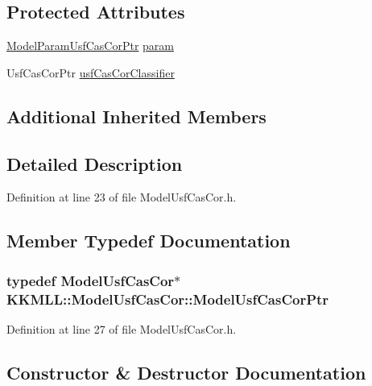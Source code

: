 \subsection*{Protected Attributes}
\begin{DoxyCompactItemize}
\item 
\hyperlink{namespace_k_k_m_l_l_aa344d19d8e93c3923eb2c82bc999e9c5}{Model\+Param\+Usf\+Cas\+Cor\+Ptr} \hyperlink{class_k_k_m_l_l_1_1_model_usf_cas_cor_a36a6059d8c3bf8c01d1ab95eb37da770}{param}
\item 
Usf\+Cas\+Cor\+Ptr \hyperlink{class_k_k_m_l_l_1_1_model_usf_cas_cor_a7aeb7274e64e73ccfeea3a9da6633d60}{usf\+Cas\+Cor\+Classifier}
\end{DoxyCompactItemize}
\subsection*{Additional Inherited Members}


\subsection{Detailed Description}


Definition at line 23 of file Model\+Usf\+Cas\+Cor.\+h.



\subsection{Member Typedef Documentation}
\subsubsection[{\texorpdfstring{Model\+Usf\+Cas\+Cor\+Ptr}{ModelUsfCasCorPtr}}]{\setlength{\rightskip}{0pt plus 5cm}typedef {\bf Model\+Usf\+Cas\+Cor}$\ast$ {\bf K\+K\+M\+L\+L\+::\+Model\+Usf\+Cas\+Cor\+::\+Model\+Usf\+Cas\+Cor\+Ptr}}\hypertarget{class_k_k_m_l_l_1_1_model_usf_cas_cor_a42b54852ed4915fd762eb8c0bb5df39b}{}\label{class_k_k_m_l_l_1_1_model_usf_cas_cor_a42b54852ed4915fd762eb8c0bb5df39b}


Definition at line 27 of file Model\+Usf\+Cas\+Cor.\+h.



\subsection{Constructor \& Destructor Documentation}
